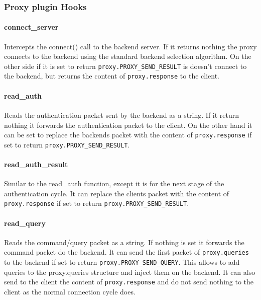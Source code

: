 \begin{comment}
\begin{itemize}
	\item never connect to a backend;
	\item replace commands;
	\item inject commands;
	\item replace responses;
\end{itemize}
\end{comment}

\subsubsection{Proxy plugin Hooks}

\paragraph{connect\_server}
Intercepts the connect() call to the backend server. If it returns nothing the proxy connects to the backend using the standard backend selection algorithm. On the other side if it is set to return \texttt{proxy.PROXY\_SEND\_RESULT} is doesn't connect to the backend, but returns the content of \texttt{proxy.response} to the client.

\paragraph{read\_auth}
Reads the authentication packet sent by the backend as a string. If it return nothing it forwards the authentication packet to the client. On the other hand it can be set to replace the backends packet with the content of \texttt{proxy.response} if set to return \texttt{proxy.PROXY\_SEND\_RESULT}.

\paragraph{read\_auth\_result\\}
Similar to the read\_auth function, except it is for the next stage of the authentication cycle. It can replace the clients packet with the content of \texttt{proxy.response} if set to return \texttt{proxy.PROXY\_SEND\_RESULT}.

\paragraph{read\_query\\}
Reads the command/query packet as a string. If nothing is set it forwards the command packet do the backend. It can send the first packet of \texttt{proxy.queries} to the backend if set to return \texttt{proxy.PROXY\_SEND\_QUERY}. This allows to add queries to the proxy.queries structure and inject them on the backend. It can also send to the client the content of \texttt{proxy.response} and do not send nothing to the client as the normal connection cycle does.

